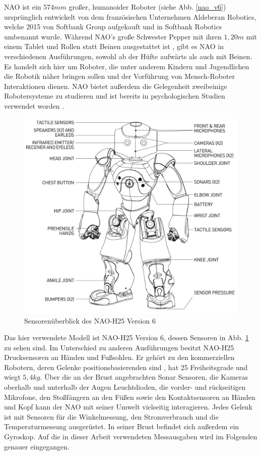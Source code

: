 NAO ist ein $574 \unit{mm}$ großer, humanoider Roboter (siehe Abb. \ref{nao_v6}) ursprünglich entwickelt von dem französischen Unternehmen Aldeberan Robotics, welche 2015 von Softbank Group aufgekauft \cite{aldebaran_to_softbank} und in Softbank Robotics umbenannt wurde. Während NAO's große Schwester Pepper mit ihren $1,20 \unit{m}$ mit einem Tablet und Rollen statt Beinen ausgestattet ist \cite{about_pepper}, gibt es NAO in verschiedenen Ausführungen, sowohl ab der Hüfte aufwärts als auch mit Beinen. Es handelt sich hier um Roboter, die unter anderem Kindern und Jugendlichen die Robotik näher bringen sollen und der Vorführung von Mensch-Roboter Interaktionen dienen. NAO bietet außerdem die Gelegenheit zweibeinige Robotersysteme zu studieren und ist bereits in psychologischen Studien verwendet worden \cite{SHAMSUDDIN20121533}. 

\begin{figure}[hb]
	\centering
	\vspace{2cm}
	\includegraphics[width=0.75\linewidth]{Bilder/nao_h25_pres.png}
	\caption{Sensorenüberblick des NAO-H25 Version 6 \cite[in /H25]{nao_naoqi_docu}}
	\label{nao_v6_h25}
\end{figure}  

Das hier verwendete Modell ist NAO-H25 Version 6, dessen Sensoren in Abb. \ref{nao_v6_h25} zu sehen sind. Im Unterschied zu anderen Ausführungen besitzt NAO-H25 Drucksensoren an Händen und Fußsohlen. Er gehört zu den kommerziellen Robotern, deren Gelenke positionsbasierenden sind \cite{balance_strategy}, hat 25 Freiheitsgrade und wiegt $5,4\unit{kg}$. Über die an der Brust angebrachten Sonar Sensoren, die Kameras oberhalb und unterhalb der Augen Leuchtdioden, die vorder- und rückseitigen Mikrofone, den Stoßfängern an den Füßen sowie den Kontaktsensoren an Händen und Kopf kann der NAO mit seiner Umwelt vielseitig interagieren. Jedes Gelenk ist mit Sensoren für die Winkelmessung, den Stromverbrauch und die Temperaturmessung ausgerüstet. In seiner Brust befindet sich außerdem ein Gyroskop. Auf die in dieser Arbeit verwendeten Messausgaben wird im Folgenden genauer eingegangen.

